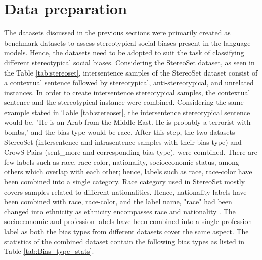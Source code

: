 \section{Data preparation}\label{data preparation}
The datasets discussed in the previous sections were primarily created as benchmark datasets to assess stereotypical social biases present in the language models. Hence, the datasets need to be adopted to suit the task of classifying different stereotypical social biases. Considering the StereoSet dataset, as seen in the Table \ref{tab:stereoset}, intersentence samples of the StereoSet dataset consist of a contextual sentence followed by stereotypical, anti-stereotypical, and unrelated instances. In order to create intersentence stereotypical samples, the contextual sentence and the stereotypical instance were combined. Considering the same example stated in Table \ref{tab:stereoset}, the intersentence stereotypical sentence would be, "He is an Arab from the Middle East. He is probably a terrorist with bombs," and the bias type would be race. After this step, the two datasets StereoSet (intersentence and intrasentence samples with their bias type) and CrowS-Pairs (sent\_more and corresponding bias type), were combined. There are few labels such as race, race-color, nationality, socioeconomic status, among others which overlap with each other; hence, labels such as race, race-color have been combined into a single category. Race category used in StereoSet mostly covers samples related to different nationalities. Hence, nationality labels have been combined with race, race-color, and the label name, "race" had been changed into ethnicity as ethnicity encompasses race and nationality \cite{winant2015race}. The socioeconomic and profession labels have been combined into a single profession label as both the bias types from different datasets cover the same aspect. The statistics of the combined dataset contain the following bias types as listed in Table \ref{tab:Bias_type_stats}. 
